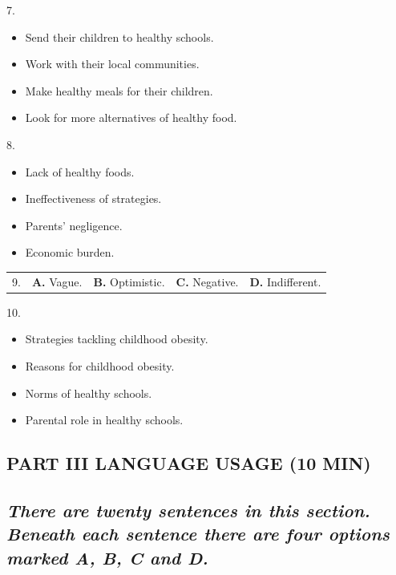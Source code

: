 \documentclass[UTF8,11pt]{ctexart}
\begin{document}
7.


\begin{itemize}[leftmargin=2em,itemsep=.2em,topsep=.4em]\item[A.] Send their children to healthy schools.
\item[B.] Work with their local communities.
\item[C.] Make healthy meals for their children.
\item[D.] Look for more alternatives of healthy food.
\end{itemize}

8.


\begin{itemize}[leftmargin=2em,itemsep=.2em,topsep=.4em]\item[A.] Lack of healthy foods.
\item[B.] Ineffectiveness of strategies.
\item[C.] Parents’ negligence.
\item[D.] Economic burden.
\end{itemize}

\noindent\begin{tabularx}{\linewidth}{@{}lXXXX@{}}9. & \textbf{A.} Vague. & \textbf{B.} Optimistic. & \textbf{C.} Negative. & \textbf{D.} Indifferent.\\\end{tabularx}\par

10.


\begin{itemize}[leftmargin=2em,itemsep=.2em,topsep=.4em]\item[A.] Strategies tackling childhood obesity.
\item[B.] Reasons for childhood obesity.
\item[C.] Norms of healthy schools.
\item[D.] Parental role in healthy schools.
\end{itemize}

\subsection*{\textbf{PART III LANGUAGE USAGE (10 MIN)}}


\subsection*{\textbf{\textit{There are twenty sentences in this section. Beneath each sentence there are four options marked A, B, C and D.}}}
\end{document}
